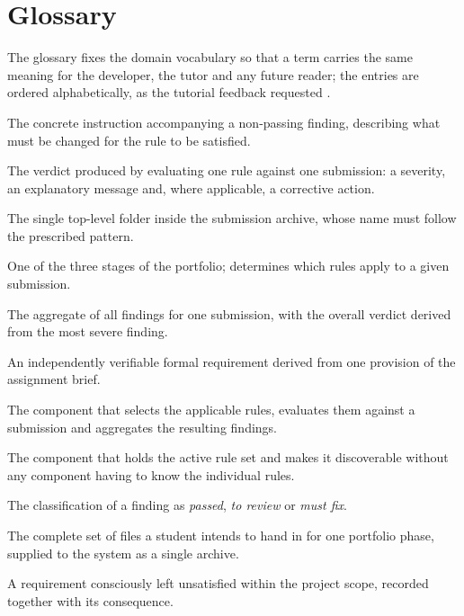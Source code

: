 \documentclass[a4paper,11pt]{article}
\begin{document}
\section{Glossary}\label{sec:glossary}

The glossary fixes the domain vocabulary so that a term carries the same meaning
for the developer, the tutor and any future reader; the entries are ordered
alphabetically, as the tutorial feedback requested \citep{Sommerville2020}.

\begin{description}[leftmargin=3.6cm, style=nextline, font=\normalfont\bfseries, itemsep=1pt]
\item[Corrective action] The concrete instruction accompanying a non-passing
finding, describing what must be changed for the rule to be satisfied.
\item[Finding] The verdict produced by evaluating one rule against one
submission: a severity, an explanatory message and, where applicable, a
corrective action.
\item[Main directory] The single top-level folder inside the submission
archive, whose name must follow the prescribed pattern.
\item[Phase] One of the three stages of the portfolio; determines which rules
apply to a given submission.
\item[Report] The aggregate of all findings for one submission, with the overall
verdict derived from the most severe finding.
\item[Rule] An independently verifiable formal requirement derived from one
provision of the assignment brief.
\item[Rule engine] The component that selects the applicable rules, evaluates
them against a submission and aggregates the resulting findings.
\item[Rule registry] The component that holds the active rule set and makes it
discoverable without any component having to know the individual rules.
\item[Severity] The classification of a finding as \textit{passed}, \textit{to
review} or \textit{must fix}.
\item[Submission] The complete set of files a student intends to hand in for one
portfolio phase, supplied to the system as a single archive.
\item[Technical debt] A requirement consciously left unsatisfied within the
project scope, recorded together with its consequence.
\end{description}
\end{document}
